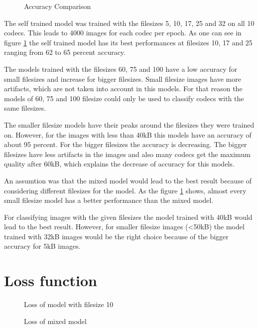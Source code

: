 \begin{figure}[h!]
	\centering
	\resizebox{\textwidth}{!}{}
	\caption{Accuracy Comparison}
	\label{fig: acc_comparison}
\end{figure}

\noindent
The self trained model was trained with the filesizes 5, 10, 17, 25 and 32 on all 10 codecs. This leads to 4000 images for each codec per epoch. As one can see in figure \ref{fig: acc_comparison} the self trained model has its best performances at filesizes 10, 17 and 25 ranging from 62 to 65 percent accuracy.

\noindent
The models trained with the filesizes 60, 75 and 100 have a low accuracy for small filesizes and increase for bigger filesizes. Small filesize images have more artifacts, which are not taken into account in this models. For that reason the models of 60, 75 and 100 filesize could only be used to classify codecs with the same filesizes.

\noindent
The smaller filesize models have their peaks around the filesizes they were trained on. However, for the images with less than 40kB this models have an accuracy of about 95 percent. For the bigger filesizes the accuracy is decreasing. The bigger filesizes have less artifacts in the images and also many codecs get the maximum quality after 60kB, which explains the decrease of accuracy for this models.

\noindent
An assumtion was that the mixed model would lead to the best result because of considering different filesizes for the model. As the figure \ref{fig: acc_comparison} shows, almost every small filesize model has a better performance than the mixed model.

\noindent
For classifying images with the given filesizes the model trained with 40kB would lead to the best result. However, for smaller filesize images (\textless 50kB) the model trained with 32kB images would be the right choice because of the bigger accuracy for 5kB images.

\section{Loss function}

\begin{figure}[h!]
    \centering
    \begin{minipage}{0.7\textwidth}
        \centering
        \resizebox{\textwidth}{!}{}
        \caption{Loss of model with filesize 10}
        \label{fig:loss_comparison_filesize_10}
    \end{minipage}\hfill
    \begin{minipage}{0.7\textwidth}
        \centering
        \resizebox{\textwidth}{!}{}
        \caption{Loss of mixed model}
        \label{fig:loss_comparison_filesize_mixed}
    \end{minipage}
\end{figure}

